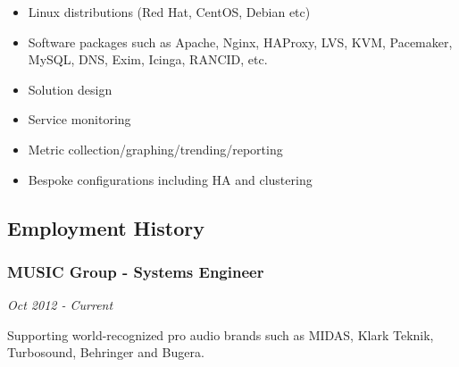 \begin{itemize}
\item
  Linux distributions (Red Hat, CentOS, Debian etc)
\item
  Software packages such as Apache, Nginx, HAProxy, LVS, KVM, Pacemaker,
  MySQL, DNS, Exim, Icinga, RANCID, etc.
\item
  Solution design
\item
  Service monitoring
\item
  Metric collection/graphing/trending/reporting
\item
  Bespoke configurations including HA and clustering
\end{itemize}
\subsection{Employment History}

\subsubsection{MUSIC Group - Systems Engineer}

\emph{Oct 2012 - Current}

Supporting world-recognized pro audio brands such as MIDAS, Klark
Teknik, Turbosound, Behringer and Bugera.


